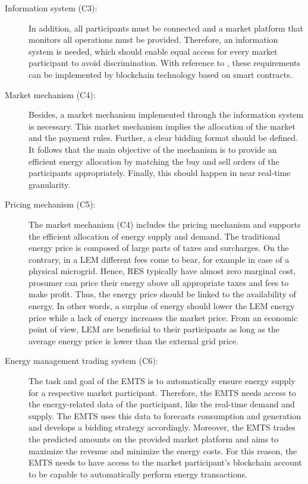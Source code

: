 \begin{description}
    \item[Information system (C3):] In addition, all participants must be connected 
    and a market platform that monitors all operations must be provided. 
    Therefore, an information system is needed, which should enable equal 
    access for every market participant to avoid discrimination. 
    With reference to , these requirements
    can be implemented by blockchain technology based on smart contracts.
    
    \item[Market mechanism (C4):] Besides, a market mechanism implemented through 
     the information system is necessary. This market mechanism implies the allocation of the
     market and the payment rules. Further, a clear bidding format should be defined. 
     It follows that the main objective of the mechanism is to provide an efficient
     energy allocation by matching the buy and sell orders of the participants appropriately.
     Finally, this should happen in near real-time granularity.    
    
    \item[Pricing mechanism (C5):] The market mechanism (C4) includes the pricing mechanism 
     and supports the efficient allocation of energy supply and demand. 
     The traditional energy price is composed of large parts of taxes and surcharges.
     On the contrary, in a LEM different fees come to bear, for example in case of a 
     physical microgrid. Hence, RES typically have almost zero marginal cost, prosumer can 
     price their energy above all appropriate taxes and fees to make profit. 
    Thus, the energy price should be linked to the availability of energy. In other words,
    a surplus of energy should lower the LEM energy price while a lack of energy increases the 
    market price. From an economic point of view, LEM are beneficial to their 
    participants as long as the average energy price is lower than the external grid price.
        
    \item[Energy management trading system (C6):] The task and goal of the EMTS
     is to automatically ensure energy supply for a respective market participant.
     Therefore, the EMTS needs access to the energy-related data of the participant, like 
     the real-time demand and supply. The EMTS uses this data to forecasts consumption and
     generation and develops a bidding strategy accordingly. 
     Moreover, the EMTS trades the predicted amounts on the provided market platform 
     and aims to maximize the revenue and minimize the energy costs. 
     For this reason, the EMTS needs to have access to the market participant’s
     blockchain account to be capable to automatically perform energy transactions.


\end{description}
